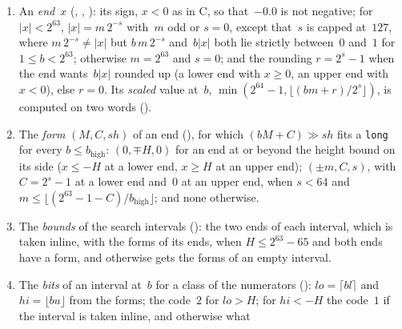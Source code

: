 \begin{definition}\label{def:exactBounds}
  \leanok
  \begin{enumerate}
    \item An \emph{end}~$x$ (,
      , ): its sign, $x < 0$
      as in C, so that~$-0.0$ is not negative; for $|x| < 2^{63}$, $|x| = m\,2^{-s}$ with~$m$ odd
      or $s = 0$, except that~$s$ is capped at~$127$, where $m\,2^{-s} \ne |x|$ but $b\,m\,2^{-s}$
      and~$b|x|$ both lie strictly between~$0$ and~$1$ for $1 \le b < 2^{63}$; otherwise
      $m = 2^{63}$ and $s = 0$; and the rounding $r = 2^s - 1$ when the end wants~$b|x|$ rounded up
      (a lower end with $x \ge 0$, an upper end with $x < 0$), else $r = 0$. Its \emph{scaled} value
      at~$b$, $\min(2^{64} - 1, \lfloor (b m + r)/2^s \rfloor)$, is computed on two words
      ().
    \item The \emph{form} $(M, C, \mathit{sh})$ of an end (),
      for which $(b M + C) \gg \mathit{sh}$ fits a \verb|long| for every $b \le b_{\mathrm{high}}$:
      $(0, \mp H, 0)$ for an end at or beyond the height bound on its side ($x \le -H$ at a lower
      end, $x \ge H$ at an upper end); $(\pm m, C, s)$, with $C = 2^s - 1$ at a lower end and~$0$
      at an upper end, when $s < 64$ and $m \le \lfloor (2^{63} - 1 - C)/b_{\mathrm{high}}
      \rfloor$; and none otherwise.
    \item The \emph{bounds} of the search intervals (): the two
      ends of each interval, which is taken inline, with the forms of its ends, when
      $H \le 2^{63} - 65$ and both ends have a form, and otherwise gets the forms of an empty
      interval.
    \item The \emph{bits} of an interval at~$b$ for a class of the numerators
      (): $\mathit{lo} = \lceil b l \rceil$ and
      $\mathit{hi} = \lfloor b u \rfloor$ from the forms; the code~$2$ for $\mathit{lo} > H$; for
      $\mathit{hi} < -H$ the code~$1$ if the interval is taken inline, and otherwise what

\end{enumerate}
\end{definition}
